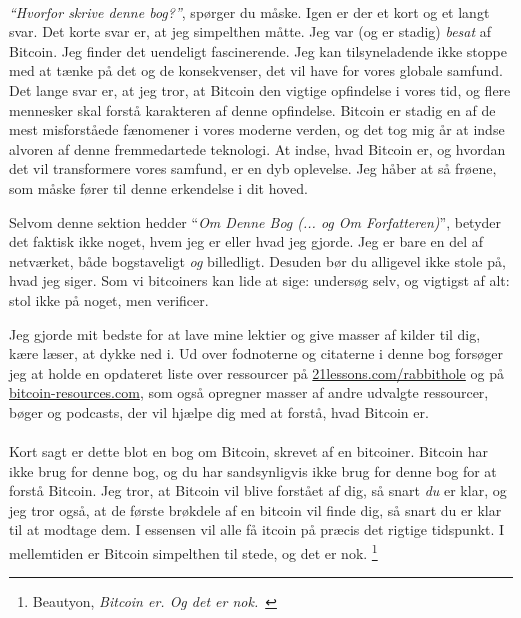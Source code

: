 \paragraph{}
\textit{\enquote{Hvorfor skrive denne bog?}}, spørger du måske. Igen er der et
kort og et langt svar. Det korte svar er, at jeg simpelthen måtte.
Jeg var (og er stadig) \textit{besat} af Bitcoin. Jeg finder det uendeligt
fascinerende. Jeg kan tilsyneladende ikke stoppe med at tænke på det og de
konsekvenser, det vil have for vores globale samfund. Det lange svar er, at jeg
tror, at Bitcoin den vigtige opfindelse i vores tid, og
flere mennesker skal forstå karakteren af denne opfindelse. Bitcoin er
stadig en af de mest misforståede fænomener i vores moderne verden, og det tog
mig år at indse alvoren af denne fremmedartede teknologi. At indse,
hvad Bitcoin er, og hvordan det vil transformere vores samfund, er en dyb
oplevelse. Jeg håber at så frøene, som måske fører til denne erkendelse
i dit hoved.

Selvom denne sektion hedder \enquote{\textit{Om Denne Bog (... og Om 
Forfatteren)}}, betyder det faktisk ikke noget, hvem jeg er eller 
hvad jeg gjorde. Jeg er bare en del af netværket, både 
bogstaveligt \textit{og} billedligt. Desuden bør du alligevel ikke stole på, 
hvad jeg siger. Som vi bitcoiners kan lide at sige: undersøg selv, og 
vigtigst af alt: stol ikke på noget, men verificer.

Jeg gjorde mit bedste for at lave mine lektier og give masser af kilder til dig,
kære læser, at dykke ned i. Ud over fodnoterne og citaterne i denne bog forsøger
jeg at holde en opdateret liste over ressourcer på
\href{https://21lessons.com/rabbithole}{21lessons.com/rabbithole} og på
\href{https://bitcoin-resources.com}{bitcoin-resources.com}, som også opregner
masser af andre udvalgte ressourcer, bøger og podcasts, der vil hjælpe dig med 
at forstå, hvad Bitcoin er.

\paragraph{}
Kort sagt er dette blot en bog om Bitcoin, skrevet af en bitcoiner.
Bitcoin har ikke brug for denne bog, og du har sandsynligvis ikke brug for denne
bog for at forstå Bitcoin. Jeg tror, at Bitcoin vil blive forstået af dig,
så snart \textit{du} er klar, og jeg tror også, at de første brøkdele af en
bitcoin vil finde dig, så snart du er klar til at modtage dem. I essensen
vil alle få \bitcoinB{}itcoin på præcis det rigtige tidspunkt. I mellemtiden er 
Bitcoin simpelthen til stede, og det er nok. \footnote{Beautyon, 
\textit{Bitcoin er. Og det er nok.}~\cite{bitcoin-is}}